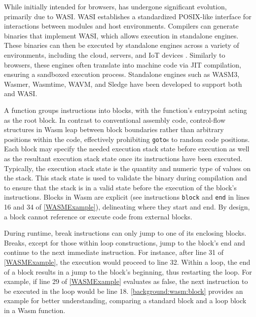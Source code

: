 While initially intended for browsers, \Wasm has undergone significant evolution, primarily due to WASI\cite{WASI}.
WASI establishes a standardized POSIX-like interface for interactions between \Wasm modules and host environments.
Compilers can generate \Wasm binaries that implement WASI, which allows execution in standalone engines.
These binaries can then be executed by standalone engines across a variety of environments, including the cloud, servers, and IoT devices \cite{makitalo2021webassembly, 2023arXiv230513241T}.
Similarly to browsers, these engines often translate \Wasm into machine code via JIT compilation, ensuring a sandboxed execution process.
Standalone engines such as WASM3, Wasmer, Wasmtime, WAVM, and Sledge\cite{Sledge} have been developed to support both \Wasm and WASI.


\label{wasm:control_flow}


A \Wasm function groups instructions into blocks, with the function's entrypoint acting as the root block. 
In contrast to conventional assembly code, control-flow structures in Wasm leap between block boundaries rather than arbitrary positions within the code, effectively prohibiting \texttt{goto}s to random code positions. 
Each block may specify the needed execution stack state before execution as well as the resultant execution stack state once its instructions have been executed.
Typically, the execution stack state is the quantity and numeric type of values on the stack. 
This stack state is used to validate the binary during compilation and to ensure that the stack is in a valid state before the execution of the block's instructions.
Blocks in Wasm are explicit (see instructions \texttt{block} and \texttt{end} in lines 16 and 34 of \autoref{WASMExample}), delineating where they start and end.
By design, a block cannot reference or execute code from external blocks.


During runtime, \Wasm break instructions can only jump to one of its enclosing blocks. 
Breaks, except for those within loop constructions, jump to the block's end and continue to the next immediate instruction. 
For instance, after line 31 of \autoref{WASMExample}, the execution would proceed to line 32. 
Within a loop, the end of a block results in a jump to the block's beginning, thus restarting the loop. 
For example, if line 29 of \autoref{WASMExample} evaluates as false, the next instruction to be executed in the loop would be line 18. 
\autoref{background:wasm:block} provides an example for better understanding, comparing a standard block and a loop block in a Wasm function.

